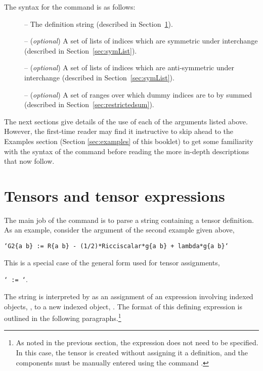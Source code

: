 \documentclass{article}
\begin{document}
The syntax for the  command is as follows:\\
\begin{cmdspec}
  \label{spec:grdef}

  \begin{description}
    \item[] -- The definition string (described in
      Section~\ref{sec:defStr}).
    \item[] -- (\textit{optional}) A set of lists of indices
      which are symmetric under interchange (described in 
      Section~\ref{sec:symList}).
    \item[] -- (\textit{optional}) A set of lists of indices
      which are anti-symmetric under interchange (described in
      Section~\ref{sec:symList}).
    \item[] -- (\textit{optional}) A set of ranges over which
      dummy indices are to by summed (described in
      Section~\ref{sec:restrictedsum}).
  \end{description}

\end{cmdspec}

The next sections give details of the use of each of the arguments
listed above. However, the first-time reader may find it instructive
to skip ahead to the Examples section (Section \ref{sec:examples} of
this booklet) to get some familiarity with the syntax of the
 command before reading the more in-depth descriptions
that now follow.
%
\section{Tensors and tensor expressions}\label{sec:defStr}
%
The main job of the  command is to parse a string containing
a tensor definition. As an example, consider the argument of the second
example given above,
\begin{center}
  \texttt{`G2\{a b\} := R\{a b\} - (1/2)*Ricciscalar*g\{a b\} +
    lambda*g\{a b\}` }
\end{center}
This is a special case of the general form used for tensor assignments,
\begin{center}
  \texttt{` := `}.
\end{center}
The string is interpreted by  as an assignment of an
expression involving indexed objects, , to a new
indexed object, . The format of this defining
expression is outlined in the following paragraphs.\footnote{As noted
in the previous section, the  expression does not
need to be specified. In this case, the tensor is created without
assigning it a definition, and the components must be manually entered
using the command .}\\
\end{document}
